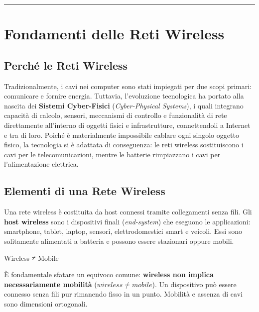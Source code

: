 \documentclass[
  italian,
  openany]{book}
\begin{document}
\begin{center}\rule{0.5\linewidth}{0.5pt}\end{center}

\section{Fondamenti delle Reti
Wireless}\label{fondamenti-delle-reti-wireless}

\subsection{Perché le Reti Wireless}\label{perchuxe9-le-reti-wireless}

Tradizionalmente, i cavi nei computer sono stati impiegati per due scopi
primari: comunicare e fornire energia. Tuttavia, l'evoluzione
tecnologica ha portato alla nascita dei \textbf{Sistemi Cyber-Fisici}
(\emph{Cyber-Physical Systems}), i quali integrano capacità di calcolo,
sensori, meccanismi di controllo e funzionalità di rete direttamente
all'interno di oggetti fisici e infrastrutture, connettendoli a Internet
e tra di loro. Poiché è materialmente impossibile cablare ogni singolo
oggetto fisico, la tecnologia si è adattata di conseguenza: le reti
wireless sostituiscono i cavi per le telecomunicazioni, mentre le
batterie rimpiazzano i cavi per l'alimentazione elettrica.

\subsection{Elementi di una Rete
Wireless}\label{elementi-di-una-rete-wireless}

Una rete wireless è costituita da host connessi tramite collegamenti
senza fili. Gli \textbf{host wireless} sono i dispositivi finali
(\emph{end-system}) che eseguono le applicazioni: smartphone, tablet,
laptop, sensori, elettrodomestici smart e veicoli. Essi sono solitamente
alimentati a batteria e possono essere stazionari oppure mobili.

\begin{calloutwarning}{Wireless ≠ Mobile}

È fondamentale sfatare un equivoco comune: \textbf{wireless non implica
necessariamente mobilità} (\(wireless \neq mobile\)). Un dispositivo può
essere connesso senza fili pur rimanendo fisso in un punto. Mobilità e
assenza di cavi sono dimensioni ortogonali.

\end{calloutwarning}
\end{document}
